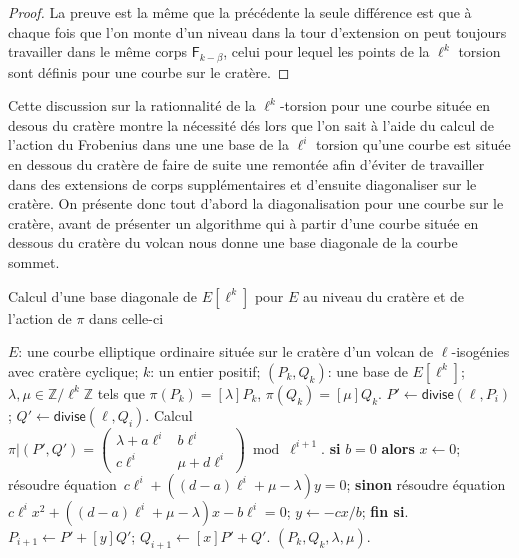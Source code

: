 \documentclass[10pt,a4paper]{book}
\theoremstyle{plain}
\theoremstyle{definition}
\theoremstyle{definition}
\theoremstyle{definition}
\theoremstyle{definition}
\theoremstyle{remark}
\theoremstyle{remark}
\theoremstyle{definition}
\begin{document}
\begin{proof}
La preuve est la même que la précédente la seule différence est que à chaque fois que l'on monte d'un niveau dans la tour d'extension on peut toujours travailler dans le même corps $\mathsf{F}_{k-\beta}$, celui pour lequel les points de la $\ell^k$ torsion sont définis pour une courbe sur le cratère.
\end{proof}
Cette discussion sur la rationnalité de la $\ell^k$-torsion pour une courbe située en desous du cratère montre la nécessité dés lors que l'on sait à l'aide du calcul de l'action du Frobenius dans une une base de la $\ell^i$ torsion qu'une courbe est située en dessous du cratère de faire de suite une remontée afin d'éviter de travailler dans des extensions de corps supplémentaires et d'ensuite diagonaliser sur le cratère. On présente donc tout d'abord la diagonalisation pour une courbe sur le cratère, avant de présenter un algorithme qui à partir d'une courbe située en dessous du cratère du volcan nous donne une base diagonale de la courbe sommet.

\begin{algorithm}
\caption{\label{alg:bas:diag}Calcul d'une base diagonale de $E[\ell^k]$ pour $E$ au niveau du cratère et de l'action de $\pi$ dans celle-ci}
\begin{algorithmic}[1]
\REQUIRE $E$: une courbe elliptique ordinaire située sur le cratère d'un volcan de $\ell$-isogénies avec cratère cyclique;
$k$: un entier positif;
\ENSURE $(P_k, Q_k )$: une base de $E[\ell^k]$;
$\lambda, \mu \in \mathbb{Z}/\ell^k \mathbb{Z}$
tels que $\pi(P_k)= [\lambda] P_k$, $ \pi(Q_k)= [\mu] Q_k$.
\STATE\label{alg:diagonal:divide}
  $P' \leftarrow \mathsf{divise}(\ell, P_{i})$; $Q' \leftarrow \mathsf{divise} (\ell, Q_{i})$.
\STATE\label{alg:diagonal:frobenius}
  Calcul $\pi|(P',Q')=\left( \begin{smallmatrix}
\lambda + a\ell^{i} & b\ell^{i}\\
c\ell^{i} & \mu + d\ell^{i} \end{smallmatrix} \right) \bmod {\ell^{i+1}}.$
\STATE\label{alg:diagonal:solve1}
  \textbf{si} $b = 0$ \textbf{alors} $x \leftarrow 0$;
  résoudre équation~$c \ell^{i} + ((d-a) \ell^{i} + \mu-\lambda) y = 0$;
\STATE\label{alg:diagonal:solve2}
  \textbf{sinon} résoudre équation
  $c \ell^{i} x^2 + ((d-a) \ell^{i}+ \mu-\lambda) x - b \ell^{i} = 0$;
  $y \leftarrow -cx/b$; \textbf{fin si}.
\STATE\label{alg:diagonal:upd-P}
  $P_{i+1} \leftarrow P' + [y] Q'$; $Q_{i+1} \leftarrow [x] P' + Q'$.
\ENDFOR
\RETURN $(P_{k},Q_{k},\lambda,\mu).$
\end{algorithmic}
\end{algorithm}
\end{document}
